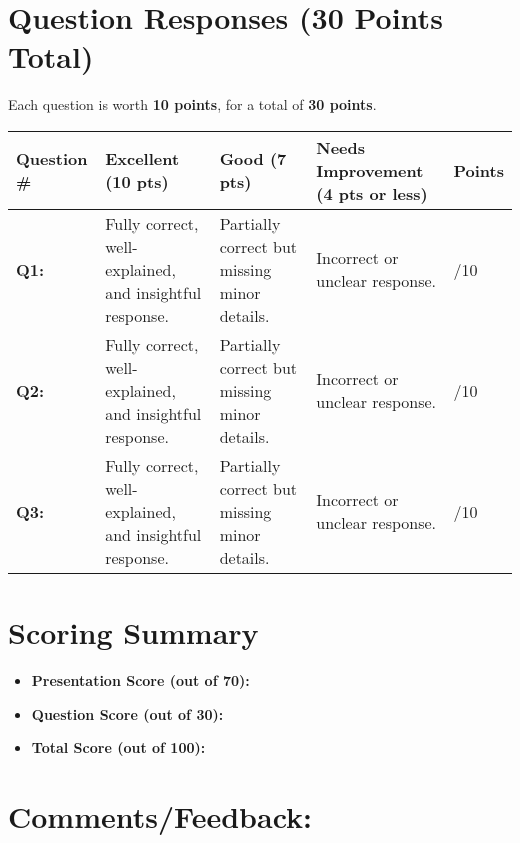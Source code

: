 \documentclass{article}
\begin{document}
\section*{Question Responses (30 Points Total)}

Each question is worth \textbf{10 points}, for a total of \textbf{30 points}.  

\begin{tabular}{|p{4cm}|p{3cm}|p{3cm}|p{3cm}|p{2cm}|}
    \hline
    \textbf{Question \#} & \textbf{Excellent (10 pts)} & \textbf{Good (7 pts)} & \textbf{Needs Improvement (4 pts or less)} & \textbf{Points} \\
    \hline
    \textbf{Q1:} & Fully correct, well-explained, and insightful response. & Partially correct but missing minor details. & Incorrect or unclear response. & \hspace{1cm} /10 \\
    \hline
    \textbf{Q2:} & Fully correct, well-explained, and insightful response. & Partially correct but missing minor details. & Incorrect or unclear response. & \hspace{1cm} /10 \\
    \hline
    \textbf{Q3:} & Fully correct, well-explained, and insightful response. & Partially correct but missing minor details. & Incorrect or unclear response. & \hspace{1cm} /10 \\
    \hline
\end{tabular}

\section*{Scoring Summary}
\begin{itemize}
    \item \textbf{Presentation Score (out of 70):} \underline{\hspace{2cm}}
    \item \textbf{Question Score (out of 30):} \underline{\hspace{2cm}}
    \item \textbf{Total Score (out of 100):} \underline{\hspace{2cm}}
\end{itemize}

\section*{Comments/Feedback:}
\underline{\hspace{15cm}} \\
\underline{\hspace{15cm}} \\
\underline{\hspace{15cm}}
\end{document}
